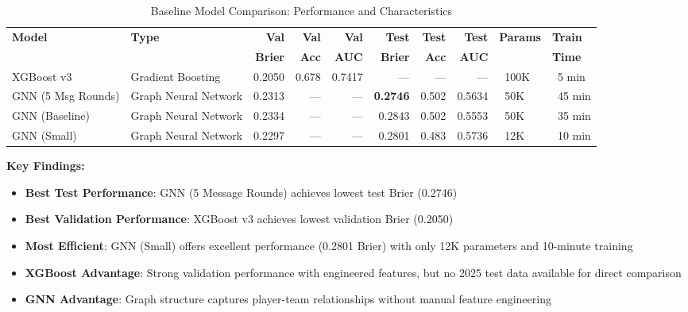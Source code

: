 
\begin{table}[htbp]
\centering
\caption{Baseline Model Comparison: Performance and Characteristics}
\label{tab:baseline_comparison}
\small
\begin{adjustbox}{max width=\textwidth}
\begin{tabular}{@{}llrrrrrrll@{}}
\toprule
\textbf{Model} & \textbf{Type} & \textbf{Val} & \textbf{Val} & \textbf{Val} & \textbf{Test} & \textbf{Test} & \textbf{Test} & \textbf{Params} & \textbf{Train} \\
 &  & \textbf{Brier} & \textbf{Acc} & \textbf{AUC} & \textbf{Brier} & \textbf{Acc} & \textbf{AUC} &  & \textbf{Time} \\
\midrule
XGBoost v3 & Gradient Boosting & 0.2050 & 0.678 & 0.7417 & --- & --- & --- & ~100K & ~5 min \\
GNN (5 Msg Rounds) & Graph Neural Network & 0.2313 & --- & --- & \textbf{0.2746} & 0.502 & 0.5634 & ~50K & ~45 min \\
GNN (Baseline) & Graph Neural Network & 0.2334 & --- & --- & 0.2843 & 0.502 & 0.5553 & ~50K & ~35 min \\
GNN (Small) & Graph Neural Network & 0.2297 & --- & --- & 0.2801 & 0.483 & 0.5736 & ~12K & ~10 min \\
\bottomrule
\end{tabular}
\end{adjustbox}

\vspace{0.5em}
\begin{minipage}{\textwidth}
\footnotesize
\textbf{Key Findings:}
\begin{itemize}[leftmargin=*, noitemsep, topsep=0pt]
    \item \textbf{Best Test Performance}: GNN (5 Message Rounds) achieves lowest test Brier (0.2746)
    \item \textbf{Best Validation Performance}: XGBoost v3 achieves lowest validation Brier (0.2050)
    \item \textbf{Most Efficient}: GNN (Small) offers excellent performance (0.2801 Brier) with only 12K parameters and 10-minute training
    \item \textbf{XGBoost Advantage}: Strong validation performance with engineered features, but no 2025 test data available for direct comparison
    \item \textbf{GNN Advantage}: Graph structure captures player-team relationships without manual feature engineering
\end{itemize}
\end{minipage}
\end{table}
